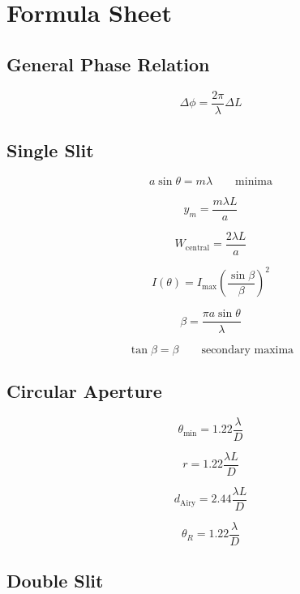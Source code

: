 \documentclass{studentnotes}
\begin{document}
\section{Formula Sheet}

\subsection{General Phase Relation}

\[
    \boxed{
        \Delta\phi
        =
        \frac{2\pi}{\lambda}\Delta L
    }
\]

\subsection{Single Slit}

\[
    \boxed{
        a\sin\theta=m\lambda
    }
    \qquad
    \text{minima}
\]

\[
    \boxed{
        y_m
        =
        \frac{m\lambda L}{a}
    }
\]

\[
    \boxed{
        W_{\text{central}}
        =
        \frac{2\lambda L}{a}
    }
\]

\[
    \boxed{
        I(\theta)
        =
        I_{\max}
            {\left(
                \frac{\sin\beta}{\beta}
                \right)}^2
    }
\]

\[
    \boxed{
        \beta
        =
        \frac{\pi a\sin\theta}{\lambda}
    }
\]

\[
    \boxed{
        \tan\beta=\beta
    }
    \qquad
    \text{secondary maxima}
\]

\subsection{Circular Aperture}

\[
    \boxed{
        \theta_{\min}
        =
        1.22\frac{\lambda}{D}
    }
\]

\[
    \boxed{
        r
        =
        1.22\frac{\lambda L}{D}
    }
\]

\[
    \boxed{
        d_{\text{Airy}}
        =
        2.44\frac{\lambda L}{D}
    }
\]

\[
    \boxed{
        \theta_R
        =
        1.22\frac{\lambda}{D}
    }
\]

\subsection{Double Slit}
\end{document}
